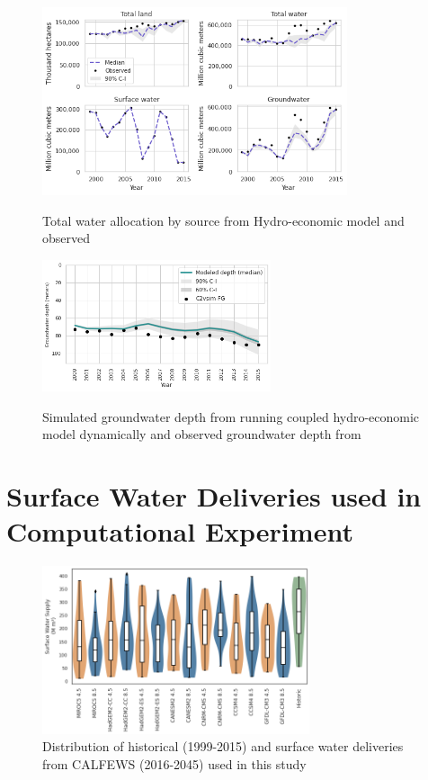 \documentclass[11pt,a4paper]{article}
\begin{document}
\begin{figure}[H]
\centering
\includegraphics[width=0.8\textwidth]{./figs/water_use_by_source.png}
\label{fig:mesh1}
\caption{Total water allocation by source from Hydro-economic model and observed}
\end{figure}

\begin{figure}[H]
\centering
\includegraphics[width=0.6\textwidth]{./figs/gw_depth.png}
\label{fig:mesh1}
\caption{Simulated groundwater depth from running coupled hydro-economic model dynamically  and observed groundwater depth from \textcite{dwr_c2vsimfg_2021}}
\end{figure}


\section{Surface Water Deliveries used in Computational Experiment}

\begin{figure}[htb!]
    \centering
    \includegraphics[width=0.7\textwidth]{./figs/gcm_surface_water.png}
    \caption{Distribution of historical (1999-2015) and surface water deliveries from CALFEWS (2016-2045) used in this study} \label{fig:SWSemitropic}
\end{figure}
\end{document}
